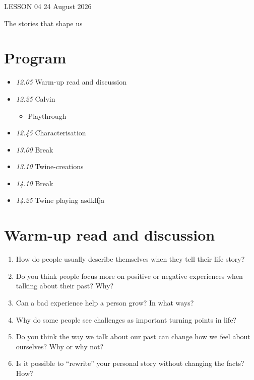 \documentclass[11pt,a4paper,oneside]{book}
\begin{document}
\clearpage{}
{\color{blue}\small LESSON 04 \hfill 24 August 2026\par}
\vspace{4mm}
{\displayfont\color{navy}\fontsize{30}{34}\selectfont The stories that shape us\par}\vspace{4mm}

\section*{Program}

\begin{itemize}
\item \emph{12.05} Warm-up read and discussion
\item \emph{12.25} Calvin

\begin{itemize}
\item Playthrough
\end{itemize}

\item \emph{12.45} Characterisation
\item \emph{13.00} Break
\item \emph{13.10} Twine-creations
\item \emph{14.10} Break
\item \emph{14.25} Twine playing asdklfja
\end{itemize}

\section*{Warm-up read and discussion}

\begin{enumerate}
\item How do people usually describe themselves when they tell their life story?
\item Do you think people focus more on positive or negative experiences when talking about their past? Why?
\item Can a bad experience help a person grow? In what ways?
\item Why do some people see challenges as important turning points in life?
\item Do you think the way we talk about our past can change how we feel about ourselves? Why or why not?
\item Is it possible to “rewrite” your personal story without changing the facts? How?
\end{enumerate}
\end{document}
